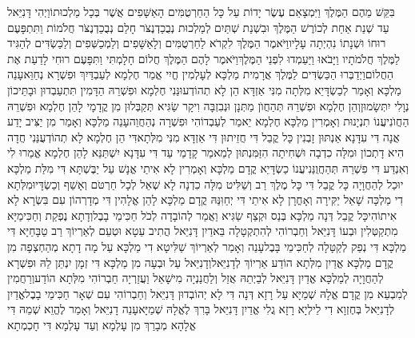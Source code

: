 \documentclass[../main/main.tex]{subfiles}
\begin{document}
\begin{multicols*}{\ncols}
בִּקֵּשׁ מֵהֶם הַמֶּלֶךְ וַיִּמְצָאֵם עֶשֶׂר יָדוֹת עַל כָּל הַחַרְטֻמִּים הָאַשָּׁפִים אֲשֶׁר בְּכָל מַלְכוּתוֹ\PreVerseSpace{}וַיְהִי דָּנִיֵּאל עַד שְׁנַת אַחַת לְכוֹרֶשׁ הַמֶּלֶךְ \ClosedSection{}וּבִשְׁנַת שְׁתַּיִם לְמַלְכוּת נְבֻכַדְנֶצֹּר חָלַם נְבֻכַדְנֶצֹּר חֲלֹמוֹת וַתִּתְפָּעֶם רוּחוֹ וּשְׁנָתוֹ נִהְיְתָה עָלָיו\PreVerseSpace{}וַיֹּאמֶר הַמֶּלֶךְ לִקְרֹא לַחַרְטֻמִּים וְלָאַשָּׁפִים וְלַמְכַשְּׁפִים וְלַכַּשְׂדִּים לְהַגִּיד לַמֶּלֶךְ חֲלֹמֹתָיו וַיָּבֹאוּ וַיַּעַמְדוּ לִפְנֵי הַמֶּלֶךְ\PreVerseSpace{}וַיֹּאמֶר לָהֶם הַמֶּלֶךְ חֲלוֹם חָלָמְתִּי וַתִּפָּעֶם רוּחִי לָדַעַת אֶת הַחֲלוֹם\PreVerseSpace{}וַיְדַבְּרוּ הַכַּשְׂדִּים לַמֶּלֶךְ אֲרָמִית מַלְכָּא לְעָלְמִין חֱיִי אֱמַר חֶלְמָא לְעַבְדַּיִךְ וּפִשְׁרָא נְחַוֵּא\PreVerseSpace{}עָנֵה מַלְכָּא וְאָמַר לְכַשְׂדָּיֵא מִלְּתָה מִנִּי אַזְדָּא הֵן לָא תְהוֹדְעוּנַּנִי חֶלְמָא וּפִשְׁרֵהּ הַדָּמִין תִּתְעַבְדוּן וּבָתֵּיכוֹן נְוָלִי יִתְּשָׂמוּן\PreVerseSpace{}וְהֵן חֶלְמָא וּפִשְׁרֵהּ תְּהַחֲוֺן מַתְּנָן וּנְבִזְבָּה וִיקָר שַׂגִּיא תְּקַבְּלוּן מִן קֳדָמָי לָהֵן חֶלְמָא וּפִשְׁרֵהּ הַחֲוֺנִי\PreVerseSpace{}עֲנוֹ תִנְיָנוּת וְאָמְרִין מַלְכָּא חֶלְמָא יֵאמַר לְעַבְדוֹהִי וּפִשְׁרָה נְהַחֲוֵה\PreVerseSpace{}עָנֵה מַלְכָּא וְאָמַר מִן יַצִּיב יָדַע אֲנָה דִּי עִדָּנָא אַנְתּוּן זָבְנִין כָּל קֳבֵל דִּי חֲזֵיתוּן דִּי אַזְדָּא מִנִּי מִלְּתָא\PreVerseSpace{}דִּי הֵן חֶלְמָא לָא תְהוֹדְעֻנַּנִי חֲדָה הִיא דָתְכוֹן וּמִלָּה כִדְבָה וּשְׁחִיתָה הִזַּמִּנְתּוּן לְמֵאמַר קָדָמַי עַד דִּי עִדָּנָא יִשְׁתַּנֵּא לָהֵן חֶלְמָא אֱמַרוּ לִי וְאִנְדַּע דִּי פִשְׁרֵהּ תְּהַחֲוֻנַּנִי\PreVerseSpace{}עֲנוֹ כַשְׂדָּיֵא קֳדָם מַלְכָּא וְאָמְרִין לָא אִיתַי אֱנָשׁ עַל יַבֶּשְׁתָּא דִּי מִלַּת מַלְכָּא יוּכַל לְהַחֲוָיָה כָּל קֳבֵל דִּי כָּל מֶלֶךְ רַב וְשַׁלִּיט מִלָּה כִדְנָה לָא שְׁאֵל לְכָל חַרְטֹּם וְאָשַׁף וְכַשְׂדָּי\PreVerseSpace{}וּמִלְּתָא דִי מַלְכָּה שָׁאֵל יַקִּירָה וְאָחֳרָן לָא אִיתַי דִּי יְחַוִּנַּהּ קֳדָם מַלְכָּא לָהֵן אֱלָהִין דִּי מְדָרְהוֹן עִם בִּשְׂרָא לָא אִיתוֹהִי\PreVerseSpace{}כָּל קֳבֵל דְּנָה מַלְכָּא בְּנַס וּקְצַף שַׂגִּיא וַאֲמַר לְהוֹבָדָה לְכֹל חַכִּימֵי בָבֶל\PreVerseSpace{}וְדָתָא נֶפְקַת וְחַכִּימַיָּא מִתְקַטְּלִין וּבְעוֹ דָּנִיֵּאל וְחַבְרוֹהִי לְהִתְקְטָלָה \ClosedSection{}בֵּאדַיִן דָּנִיֵּאל הֲתִיב עֵטָא וּטְעֵם לְאַרְיוֹךְ רַב טַבָּחַיָּא דִּי מַלְכָּא דִּי נְפַק לְקַטָּלָה לְחַכִּימֵי בָּבֶל\PreVerseSpace{}עָנֵה וְאָמַר לְאַרְיוֹךְ שַׁלִּיטָא דִי מַלְכָּא עַל מָה דָתָא מְהַחְצְפָה מִן קֳדָם מַלְכָּא אֱדַיִן מִלְּתָא הוֹדַע אַרְיוֹךְ לְדָנִיֵּאל\PreVerseSpace{}וְדָנִיֵּאל עַל וּבְעָה מִן מַלְכָּא דִּי זְמָן יִנְתֵּן לֵהּ וּפִשְׁרָא לְהַחֲוָיָה לְמַלְכָּא \ClosedSection{}אֱדַיִן דָּנִיֵּאל לְבַיְתֵהּ אֲזַל וְלַחֲנַנְיָה מִישָׁאֵל וַעֲזַרְיָה חַבְרוֹהִי מִלְּתָא הוֹדַע\PreVerseSpace{}וְרַחֲמִין לְמִבְעֵא מִן קֳדָם אֱלָהּ שְׁמַיָּא עַל רָזָא דְּנָה דִּי לָא יְהוֹבְדוּן דָּנִיֵּאל וְחַבְרוֹהִי עִם שְׁאָר חַכִּימֵי בָבֶל\PreVerseSpace{}אֱדַיִן לְדָנִיֵּאל בְּחֶזְוָא דִי לֵילְיָא רָזָא גֲלִי אֱדַיִן דָּנִיֵּאל בָּרִךְ לֶאֱלָהּ שְׁמַיָּא\PreVerseSpace{}עָנֵה דָנִיֵּאל וְאָמַר לֶהֱוֵא שְׁמֵהּ דִּי אֱלָהָא מְבָרַךְ מִן עָלְמָא וְעַד עָלְמָא דִּי חָכְמְתָא 
\end{multicols*}
\end{document}
